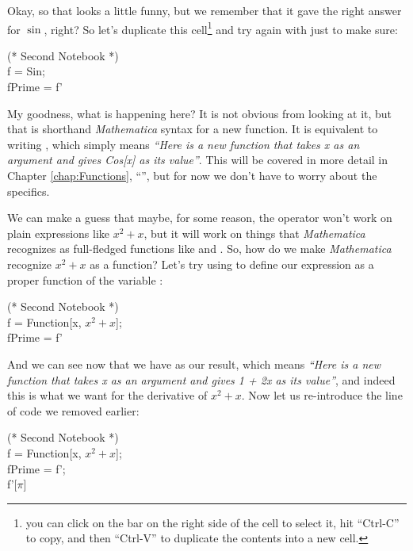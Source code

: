 Okay, so that looks a little funny, but we remember that it gave the right answer for $\sin$, right? So let's duplicate this cell\footnote{you can click on the bar on the right side of the cell to select it, hit ``Ctrl-C'' to copy, and then ``Ctrl-V'' to duplicate the contents into a new cell.} and try again with  just to make sure:

\begin{code}
	   (* Second Notebook *)\\
	   f = Sin;\\
	   fPrime = f'\\
\end{code}

My goodness, what is happening here? It is not obvious from looking at it, but that is shorthand \emph{Mathematica} syntax for a new function. It is equivalent to writing , which simply means \emph{``Here is a new function that takes x as an argument and gives Cos[x] as its value''}. This will be covered in more detail in Chapter \ref{chap:Functions}, ``'', but for now we don't have to worry about the specifics. 

We can make a guess that maybe, for some reason, the  operator won't work on plain expressions like $x^2 + x$, but it will work on things that \emph{Mathematica} recognizes as full-fledged functions like  and . So, how do we make \emph{Mathematica} recognize $x^2 + x$ as a function? Let's try using  to define our expression as a proper function of the variable :

\begin{code}
	   (* Second Notebook *)\\
	   f = Function[x, $x^2 + x$];\\
	   fPrime = f'\\
\end{code}

And we can see now that we have  as our result, which means \emph{``Here is a new function that takes x as an argument and gives 1 + 2x as its value''}, and indeed this is what we want for the derivative of $x^2 + x$. Now let us re-introduce the line of code we removed earlier:

\begin{code}
	   (* Second Notebook *)\\
	   f = Function[x, $x^2 + x$];\\
	   fPrime = f';\\
	   f'[$\pi$]\\
\end{code}

